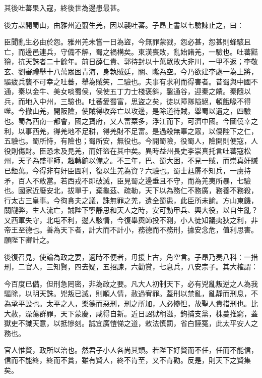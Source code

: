 \begin{pinyinscope}
 其後吐蕃果入寇，終後世為邊患最甚。



 後方謀開蜀山，由雅州道翦生羌，因以襲吐蕃。子昂上書以七驗諫止之，曰：



 臣聞亂生必由於怨。雅州羌未嘗一日為盜，今無罪蒙戮，怨必甚，怨甚則蜂駭且亡，而邊邑連兵，守備不解，蜀之禍構矣。東漢喪敗，亂始諸羌，一驗也。吐蕃黠獪，抗天誅者二十餘年。前日薛仁貴、郭待封以十萬眾敗大非川，一甲不返；李敬玄、劉審禮舉十八萬眾困青海，身執賊廷，關、隴為空。今乃欲建李處一為上將，驅疲兵襲不可幸之吐蕃，舉為賊笑，二驗也。夫事有求利而得害者。昔蜀與中國不通，秦以金牛、美女啖蜀侯，侯使五丁力士棧褒斜，鑿通谷，迎秦之饋。秦隨以兵，而地入中州，三驗也。吐蕃愛蜀富，思盜之矣，徒以障隊隘絕，頓餓喙不得噬。今撤山羌，開阪險，使賊得收奔亡以攻邊，是除道待賊，舉蜀以遺之，四驗也。蜀為西南一都會，國之寶府，又人富粟多，浮江而下，可濟中國。今圖僥幸之利，以事西羌，得羌地不足耕，得羌財不足富。是過殺無辜之眾，以傷陛下之仁，五驗也。蜀所恃，有險也；蜀所安，無役也。今開蜀險，役蜀人，險開則便寇，人役則傷財。臣恐未及見羌，而奸盜在其中矣。異時益州長史李崇真托言吐蕃寇松州，天子為盛軍師，趣轉餉以備之。不三年，巴、蜀大困，不見一賊，而崇真奸贓已鉅萬。今得非有奸臣圖利，復以生羌為資？六驗也。蜀士尪孱不知兵，一虜持矛，百人不敢當。若西戎不即破滅，臣見蜀之邊垂且不守，而為羌夷所暴，七驗也。國家近廢安北，拔單于，棄龜茲、疏勒，天下以為務仁不務廣，務養不務殺，行太古三皇事。今徇貪夫之議，誅無罪之羌，遺全蜀患，此臣所未諭。方山東饑，關隴弊，生人流亡，誠陛下寧靜思和天人之時，安可動甲兵、興大役，以自生亂？又西軍失守，北屯不利，邊人駭情，今復舉輿師投不測，小人徒知議夷狄之利，非帝王至德也。善為天下者，計大而不計小，務德而不務刑，據安念危，值利思害。願陛下審計之。



 後復召見，使論為政之要，適時不便者，毋援上古，角空言。子昂乃奏八科：一措刑，二官人，三知賢，四去疑，五招諫，六勸賞，七息兵，八安宗子。其大榷謂：



 今百度已備，但刑急罔密，非為政之要。凡大人初制天下，必有兇亂叛逆之人為我驅除，以明天誅。兇叛已滅，則順人情，赦過宥罪。蓋刑以禁亂，亂靜而刑息，不為承平設也。太平之人，樂德而惡刑，刑之所加，人必慘怛，故聖人貴措刑也。比大赦，澡蕩群罪，天下蒙慶，咸得自新。近日詔獄稍滋，鉤捕支黨，株蔓推窮，蓋獄吏不識天意，以抵慘刻。誠宜廣愷悌之道，敕法慎罰，省白誣冤，此太平安人之務也。



 官人惟賢，政所以治也。然君子小人各尚其類。若陛下好賢而不任，任而不能信，信而不能終，終而不賞，雖有賢人，終不肯至，又不肯勸。反是，則天下之賢集矣。




\end{pinyinscope}
